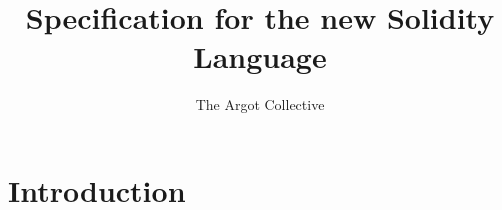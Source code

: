\documentclass[a4paper, 11pt]{article}
\title{Specification for the new Solidity Language}
\author{The Argot Collective}
\begin{document}
\maketitle

\lstset{
  language=solidity,
  basicstyle=\ttfamily\small,
  keywordstyle=\bfseries,
}



\newcommand{\word}{\ensuremath{\mathtt{word}}}
\newcommand{\unit}{\ensuremath{\mathtt{unit}}}
\newcommand{\bool}{\ensuremath{\mathtt{bool}}}
\newcommand{\typing}[1]{\ensuremath{\overset{\text{\tiny{#1}}}{\vdash}}}
\newcommand{\cc}{\ensuremath{\overset{\text{cc}}}{\leadsto}}
\newcommand{\inst}{\ensuremath{\sqsubseteq}}
\newcommand{\invoke}{\ensuremath{\mathtt{Invokable.invoke}}}
\newcommand{\invokable}{\ensuremath{\mathtt{Invokable}}}
\newcommand{\dom}[1]{\ensuremath{\mathtt{dom}(#1)}}
\newcommand{\id}{\ensuremath{\mathtt{id}}}
\newcommand{\ftv}{\ensuremath{\mathtt{ftv}}}
\newcommand{\fpv}{\ensuremath{\mathtt{fpv}}} 
\newcommand{\closuretype}{\ensuremath{\overset{\tiny{ctype}}{\leadsto}}}
\newcommand{\sig}{\ensuremath{\overset{\tiny{sig}}{\leadsto}}}
\newcommand{\unique}{\ensuremath{\overset{\tiny{unique}}{\leadsto}}}
\newcommand{\geninvoke}{\ensuremath{\overset{\tiny{gen}}{\leadsto}}}
\newcommand{\sats}[3]{\Theta ; #3 \vdash^{\mathtt{sats}} #1 \leadsto #2}
\newcommand{\mgu}{\ensuremath{\mathtt{mgu}}}
\newcommand{\reduce}{\vdash^{\mathtt{red}}}
\newcommand{\simp}{\vdash^{\mathtt{simp}}}
\newcommand{\impr}{\vdash^{\mathtt{impr}}}
\newcommand{\solidity}{new Solidity } 

\newtheorem{Lemma}{Lemma}
\newtheorem{Theorem}{Theorem}
\newtheorem{Corollary}{Corollary}
\theoremstyle{definition}
\newtheorem{Definition}{Definition}
\newtheorem{Example}{Example}



\section{Introduction}\label{sec:introduction}
\end{document}
